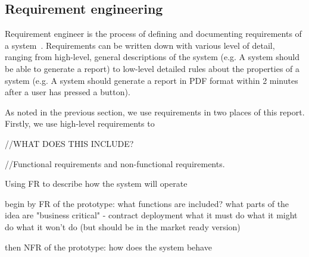 \subsection{Requirement engineering}

Requirement engineer is the process of defining and documenting requirements of a system~\cite{Sommerville2011SoftwareEngineering}. Requirements can be written down with various level of detail, ranging from high-level, general descriptions of the system (e.g. A system should be able to generate a report) to low-level detailed rules about the properties of a system (e.g. A system should generate a report in PDF format within 2 minutes after a user has pressed a button). 

As noted in the previous section, we use requirements in two places of this report. Firstly, we use high-level requirements to 

//WHAT DOES THIS INCLUDE?

//Functional requirements and non-functional requirements.

Using FR to describe how the system will operate
 
begin by FR of the prototype: what functions are included? what parts of the idea are "business critical" - contract deployment
what it must do
what it might do
what it won't do (but should be in the market ready version)

then NFR of the prototype: how does the system behave



